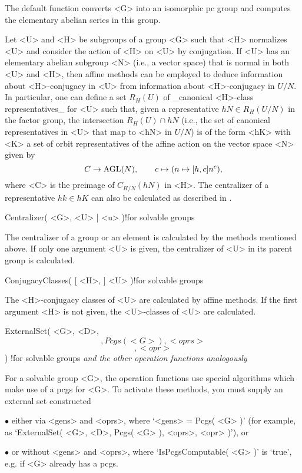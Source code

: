 The default  function converts   <G> into an   isomorphic pc   group  and
computes the elementary abelian series in this group.


Let <U> and <H> be subgroups of a group <G>  such that <H> normalizes <U>
and consider the   action of <H> on  <U>  by conjugation. If   <U> has an
elementary abelian subgroup <N> (i.e., a vector space)  that is normal in
both  <U> and   <H>, then  affine   methods  can  be employed to   deduce
information   about   <H>-conjugacy    in  <U>  from   information  about
<H>-conjugacy in $U/N$.  In particular, one  can define a set $R_H(U)$ of
_canonical <H>-class    representatives_   for <U>  such  that,  given  a
representative  $hN\in  R_H(U/N)$ in  the  factor group, the intersection
$R_H(U) \cap hN$ (i.e., the set  of canonical representatives in <U> that
map  to <hN>  in  $U/N$) is of   the form <hK>   with <K> a set of  orbit
representatives of the affine action on the vector space <N> given by
$$ C \to {\rm AGL}(N), \qquad c \mapsto ( n \mapsto [h,c] n^c ), $$
where <C> is the preimage  of $C_{H/N}(hN)$ in  <H>. The centralizer of a
representative  $hk  \in  hK$  can also  be   calculated  as described in
\cite{MeckyNeubuser89}.

\>Centralizer( <G>, <U> | <u> )!{for solvable groups}

The centralizer of a  group or an element   is calculated by  the methods
mentioned  above. If only one argument  <U> is given,  the centralizer of
<U> in its parent group is calculated.

\>ConjugacyClasses( [ <H>, ] <U> )!{for solvable groups}

The <H>-conjugacy classes of <U> are calculated by affine methods. If the
first argument <H> is not given, the <U>-classes of <U> are calculated.


\>ExternalSet( <G>, <D>, \[, {Pcgs( <G> )}, <oprs> \] \[, <opr> \] )%
  !{for solvable groups}
\)\it and the other operation functions analogously

For a solvable group <G>, the  operation functions use special algorithms
which make use of  a pcgs for  <G>. To activate  these methods, you  must
supply an external set constructed
\beginlist
\item{$\bullet$}
  either via <gens>    and <oprs>, where `<gens>   =  Pcgs( <G>  )'  (for
  example, as `ExternalSet( <G>, <D>, Pcgs( <G> ), <oprs>, <opr> )'), or
\item{$\bullet$}
  or without   <gens> and  <oprs>, where   `IsPcgsComputable(  <G> )'  is
  `true', e.g. if <G> already has a pcgs.
\endlist

